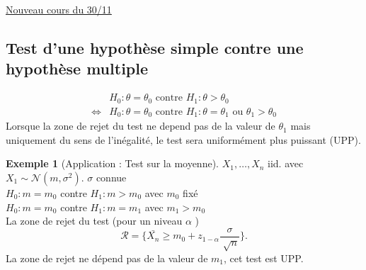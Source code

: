 \documentclass{article}
\theoremstyle{plain}%
\theoremstyle{definition}
\newtheorem{exmp}{Exemple}[section]
\theoremstyle{remark}
\begin{document}
\underline{Nouveau cours du 30/11} \\

\subsection{Test d'une hypothèse simple contre une hypothèse multiple}
\begin{align*}
                & H_0: \theta = \theta _0 \text{ contre } H_1: \theta > \theta _0 \\
\Leftrightarrow & H_0: \theta = \theta _0 \text{ contre } H_1: \theta = \theta _1 \text{ ou } \theta _1 > \theta _0
\end{align*}
Lorsque la zone de rejet du test ne depend pas de la valeur de $ \theta _1 $ mais uniquement du sens de l'inégalité, le test sera uniformément plus puissant (UPP).

\begin{exmp}[Application : Test sur la moyenne]
    $ X_1, \dots, X_n $ iid. avec $ X_1 \sim \mathcal{N}(m, \sigma ^2) $. $ \sigma $ connue \\
    $ H_0: m=m_0 $ contre $ H_1: m>m_0 $ avec $ m_0 $ fixé   \\
    $ H_0: m=m_0 $ contre $ H_1: m=m_1 $ avec $ m_1 > m_0 $  \\
    La zone de rejet du test (pour un niveau $ \alpha  $ )
    \[
        \mathcal{R} = \{\bar{X_n} \geq m_0 + z_{1 - \alpha } \frac{\sigma }{\sqrt[]{n}}\}
    .\]
    La zone de rejet ne dépend pas de la valeur de $ m_1 $, cet test est UPP.
\end{exmp}
\end{document}

